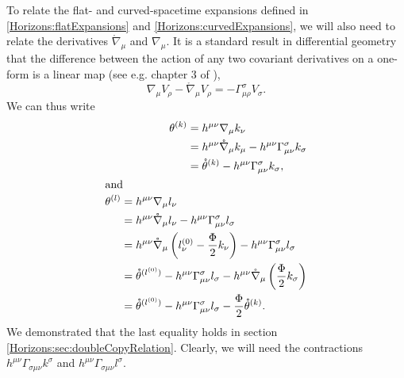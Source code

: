 To relate the flat- and curved-spacetime expansions defined in \eqref{Horizons:flatExpansions} and \eqref{Horizons:curvedExpansions}, we will also need to relate the derivatives $\mathring{\nabla}_\mu$ and $\nabla_\mu$. It is a standard result in differential geometry that the difference between the action of any two covariant derivatives on a one-form is a linear map (see e.g. chapter 3 of \cite{Wald:1984rg}), 
\begin{equation}
    \nabla_\mu V_\rho - \mathring{\nabla}_\mu V_\rho = -\Gamma_{\mu \rho}^{\sigma} V_{\sigma}.
\end{equation}
We can thus write
\begin{align}
    \begin{split} \label{Horizons:thetaKIntermediate}
        \theta^{(k)}
        &= h^{\mu \nu} \nabla_\mu k_\nu \\
        &= h^{\mu \nu} \mathring{\nabla}_\mu k_\mu - h^{\mu \nu} \Gamma_{\mu \nu}^\sigma k_\sigma \\
        &= \mathring{\theta}^{(k)} - h^{\mu \nu} \Gamma_{\mu \nu}^\sigma k_\sigma,
    \end{split} \\
    \intertext{and}
    \begin{split} \label{Horizons:thetaLIntermediate}
        \theta^{(l)}
        &= h^{\mu \nu} \nabla_\mu l_\nu \\
        &= h^{\mu \nu} \mathring{\nabla}_\mu l_\nu - h^{\mu \nu} \Gamma_{\mu \nu}^\sigma l_\sigma \\
        &= h^{\mu \nu} \mathring{\nabla}_\mu \left(l_\nu^{(0)} - \frac{\Phi}{2} k_\nu \right) - h^{\mu \nu} \Gamma_{\mu \nu}^\sigma l_\sigma \\
        &= \mathring{\theta}^{(l^{(0)})} -  h^{\mu \nu} \Gamma_{\mu \nu}^\sigma l_\sigma - h^{\mu \nu} \mathring{\nabla}_\mu \left( \frac{\Phi}{2} k_\sigma \right) \\
        &= \mathring{\theta}^{(l^{(0)})} -  h^{\mu \nu} \Gamma_{\mu \nu}^\sigma l_\sigma - \frac{\Phi}{2}\mathring{\theta}^{(k)}.
    \end{split}
\end{align}
We demonstrated that the last equality holds in section \ref{Horizons:sec:doubleCopyRelation}. Clearly, we will need the contractions $h^{\mu \nu} \Gamma_{\sigma \mu \nu} k^\sigma$ and $h^{\mu \nu} \Gamma_{\sigma \mu \nu} l^\sigma$.

